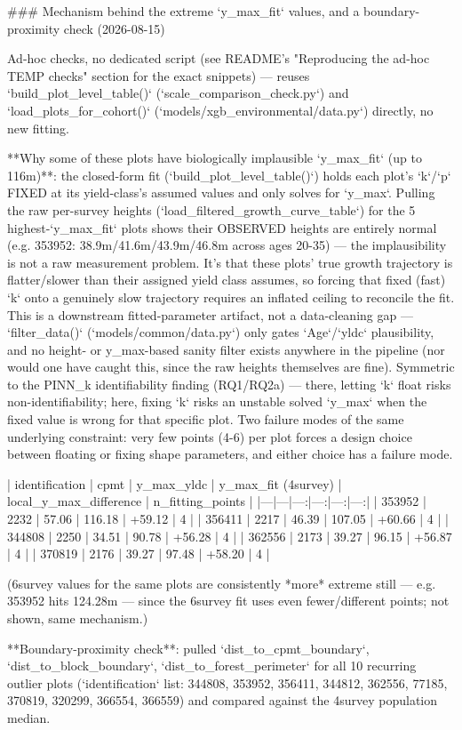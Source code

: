 ### Mechanism behind the extreme `y_max_fit` values, and a boundary-proximity check (2026-08-15)

Ad-hoc checks, no dedicated script (see README's "Reproducing the ad-hoc TEMP checks" section for
the exact snippets) — reuses `build_plot_level_table()` (`scale_comparison_check.py`) and
`load_plots_for_cohort()` (`models/xgb_environmental/data.py`) directly, no new fitting.

**Why some of these plots have biologically implausible `y_max_fit` (up to 116m)**: the closed-form
fit (`build_plot_level_table()`) holds each plot's `k`/`p` FIXED at its yield-class's assumed
values and only solves for `y_max`. Pulling the raw per-survey heights (`load_filtered_growth_curve_table`)
for the 5 highest-`y_max_fit` plots shows their OBSERVED heights are entirely normal (e.g. 353952:
38.9m/41.6m/43.9m/46.8m across ages 20-35) — the implausibility is not a raw measurement problem.
It's that these plots' true growth trajectory is flatter/slower than their assigned yield class
assumes, so forcing that fixed (fast) `k` onto a genuinely slow trajectory requires an inflated
ceiling to reconcile the fit. This is a downstream fitted-parameter artifact, not a data-cleaning
gap — `filter_data()` (`models/common/data.py`) only gates `Age`/`yldc` plausibility, and no
height- or y_max-based sanity filter exists anywhere in the pipeline (nor would one have caught
this, since the raw heights themselves are fine). Symmetric to the PINN_k identifiability finding
(RQ1/RQ2a) — there, letting `k` float risks non-identifiability; here, fixing `k` risks an unstable
solved `y_max` when the fixed value is wrong for that specific plot. Two failure modes of the same
underlying constraint: very few points (4-6) per plot forces a design choice between floating or
fixing shape parameters, and either choice has a failure mode.

| identification | cpmt | y\_max\_yldc | y\_max\_fit (4survey) | local\_y\_max\_difference | n\_fitting\_points |
|---|---|---:|---:|---:|---:|
| 353952 | 2232 | 57.06 | 116.18 | +59.12 | 4 |
| 356411 | 2217 | 46.39 | 107.05 | +60.66 | 4 |
| 344808 | 2250 | 34.51 | 90.78 | +56.28 | 4 |
| 362556 | 2173 | 39.27 | 96.15 | +56.87 | 4 |
| 370819 | 2176 | 39.27 | 97.48 | +58.20 | 4 |

(6survey values for the same plots are consistently *more* extreme still — e.g. 353952 hits
124.28m — since the 6survey fit uses even fewer/different points; not shown, same mechanism.)

**Boundary-proximity check**: pulled `dist_to_cpmt_boundary`, `dist_to_block_boundary`,
`dist_to_forest_perimeter` for all 10 recurring outlier plots (`identification` list: 344808,
353952, 356411, 344812, 362556, 77185, 370819, 320299, 366554, 366559) and compared against the
4survey population median.

